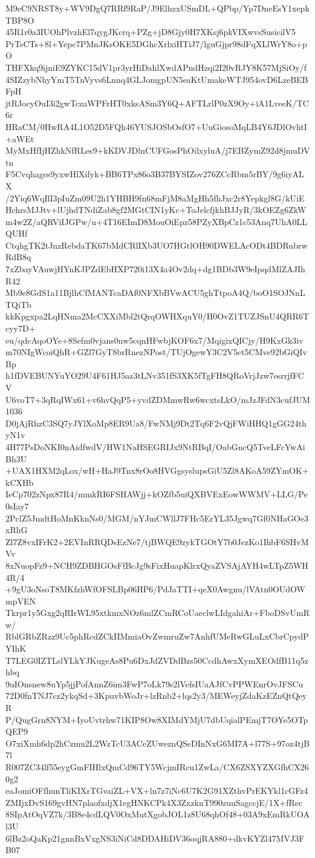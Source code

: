 M9eC9NRST8y+WV9DgQ7RRf9RaP/J9ElhzxUSmDL+QPbp/Yp7DneEsY1xepkTBP8O
45R1r0a3IUOhPlvzhEl7qygJKcrq+PZg+jD8Gjy0H7XKsj6pkVIXwvsSusicilV5
PrTsCTs+8l+Yepc7PMnJKsOKE5DGhcXrlxiHTiJ7/lguGjpr98dFqXLlWrY8o+pO
THFXkq9ijniE9ZYKC15dV1pr3yrHiDahlXwdAPndHzqi2I20vRJY8K57MjSiOy/f
4SIZzybNhyYmT5TnVyvs6Lnnq4GLJomgpUN5eaKtUmakeWTJ954ovD6LzeBEBFpH
jtRJocyOuI3i2gwTczaWPFrHT0xksASm3Y6Q+AFTLrlP0zX9Oy+iA1LveeK/TC6r
HRaCM/0HwRA4L1O52D5FQh46YUSJOSbOsfO7+UuGiosoMqLB4Y6JDlOvhtI+aWEt
MyMxHfIjHZhkNfRLes9+kKDVJDlnCUFGosPhOilxyluA/j7EBZymZ92d8jmuDVtn
F5Cvqhages9yxwHlXifyk+BB6TPx86o3B37BYSIZov276ZCcRbm5rBY/9g6iyALX
/2Yiq6WqIlI3pIuZm09U2h1YHBH9fn68mFjM8aMgHh5fhJxc2r8Yepkgl8G/kUiE
HchrsMJJtv+lUjhdTNdiZab8gf2MGtCIN1yKc+ToJelcfjkhBJJyR/3kOEZg6ZkW
m4w2Z/aQRViIJGPw/u+4T16EImD8MouOiEpz58PZyXBpCz1c53Anq7UhA0LLQUHf
CtqhgTK2tJnzRebdaTK67bMdCRlIXb3UO7HGtlOH90DWELAcODt4BDRubrwRdB8q
7xZbayVAuwjHYnKJPZdEbHXP720i13X4a4Ov2dq+dg1BDb3W9eIpqdMlZAJIhR42
Mb9e8GdS1a11BjlhCfMANTcaDAf0NFXbBVwACU5ghTtpoA4Q/boO1SOJNnLTQiTb
kkKpgxpa2LqHNma2McCXXiMbl2tQrqOWHXquY0/H0OvZ1TUZJSnU4QRR6Tcyy7D+
eu/qdcAqoOYe+8Sefm0vjans0nw5cqnHFwbjKOF6x7/MqigixQICjy/H9KxGk3iv
m70NIgWcoiQhR+GZl7GyT8brRnezNPost/TUjOgewY3C2V5ct5CMve92bGiQIvBp
h1fDVEBUNYuYO29U4F61HJ5az3tLNv351fS3XK5fTgFH8QRoVrjJzw7esrrjfFCV
U6voT7+3qRqIWx61+v6hvQqP5+yvdZDMmwRw6wcxtsLkO/mJzJFdN3cufJUM1036
D0jAjRhzC3SQ7yJYlXoMp8ER9Ua8/FwNMj9Dt2Tq6F2vQjFWiHHQ1gGG24thyN1v
4H77PsDoNKI0nAidfwdV/HW1NaHSEGRIJx9NtRBqI/OabGncQ5TveLFcYwAiBh3U
+UAX1HXM2qLox/wH+HaJ9Tnx8rOo8HVGgsyslupsGiU5Zl8AKoA59ZYmOK+kCXHb
IeCp702zNpx87R4/mmkRI6FSHAWjj+kOZfb5uiQXBVExEowWWMV+LLG/Pe0sIay7
2PclZ5JmdtHoMnKknNs0/MGM/nYJmCWllJ7FHc5ErYL35Jgwq7Gf0NHaGOe3xRhG
Zl7Z8vxIFrK2+2EVInRRQDsEzNe7/tjBWQE9zykTGOtY7b0JezKo1IhbF6SHvMVv
8xNuopFz9+NCH9ZDBHGOsFfBcJg9sFixHuapKlrxQyaZVSAjAYH4wLTpZ5WH4R/4
+9gU3oNsoT8MKfzhWfOFSLBp06HP6/PdJaTTI+qeX0Awgnu/lVAtn0OUdOWmpVEN
Tkrpr1y5Gxg2qRIrWL95xtkmxNOz6mlZCmRCoUaeclwLIdgahiAr+FboDSvUmRw/
RblGRbZRzz9Uc5phRcdZCkIIMmiaOvZwmruZw7AnhfUMeRwGLuLxCbrCpydPYIhK
T7LEG0IZTLslYLkYJKugeAs8Pu6DxJdZVDdBzs50CcdhAwxXymXEOdfB11q5zhbq
9uIOnsnew8uYp5jjPofAnnZ6im3FwP7oLk79s2lVefsIUaAJfCvPPWEnrOvJFSCu
72D0fnTNJ7cz2ykqSd+3KpuvbWoJr+lzRnb2+lqs2y3/MEWeyjZdaKzEZnQtQeyR
P/QugGrn8NYM+IyoUvtrhw71KIP8Ow8XIMdYMjU7dbUqialPEmjT7OYe5OTpQEP9
O7xiXmh6dp2hCzmu2L2WzTcU3ACeZUweznQSeDInNxG6MI7A+l77S+97oz4tjB7l
R007ZC34lf55eygGmFIHlxQmCd96TY5WcjmIRcu1ZwLa/CX6ZSXYZXGfhCX260g2
eaJomiOFfhunTliKIXrTGvaiZL+VX+ln7z7iNc6U7K2G91XZthvPrEKYkl1cGFz4
ZMIjxDvS169gvHN7plaofxdjX1egHNKCPk4X3ZxzknT990zuuSagccjE/1X+fRec
8SIpAtOqVZ7k/3B8e4cdLQV0OxMutXgobJOL1z8U68qhOf48+03A9xEmRkUOAl3U
6lBz2oQaKp21gnnBxVxgNS3iNiCd8DDAHiDV36oqjRA880+dkvKYZl47MVJ3FB07
